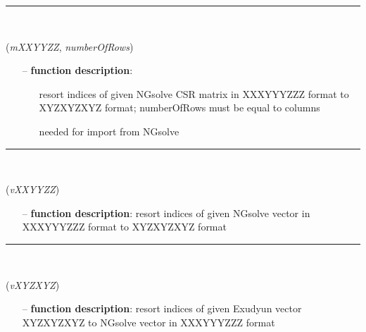 \begin{itemize}[leftmargin=1.4cm]
\begin{itemize}[leftmargin=0.5cm]
\begin{itemize}[leftmargin=1.4cm]
\begin{itemize}[leftmargin=0.5cm]
%
\noindent\rule{8cm}{0.75pt}\vspace{1pt} \\ 
\begin{flushleft}
\label{sec:FEM:ResortIndicesOfCSRmatrix}
({\it mXXYYZZ}, {\it numberOfRows})
\end{flushleft}
\setlength{\itemindent}{0.7cm}
\begin{itemize}[leftmargin=0.7cm]
  \item[--]  {\bf function description}: \vspace{-6pt}
  \begin{itemize}[leftmargin=1.2cm]
\setlength{\itemindent}{-0.7cm}
    \item[] resort indices of given NGsolve CSR matrix in XXXYYYZZZ format to XYZXYZXYZ format; numberOfRows must be equal to columns
    \item[] needed for import from NGsolve
  \end{itemize}
\vspace{12pt}\end{itemize}
%
\noindent\rule{8cm}{0.75pt}\vspace{1pt} \\ 
\begin{flushleft}
\label{sec:FEM:ResortIndicesOfNGvector}
({\it vXXYYZZ})
\end{flushleft}
\setlength{\itemindent}{0.7cm}
\begin{itemize}[leftmargin=0.7cm]
  \item[--]  {\bf function description}: resort indices of given NGsolve vector in XXXYYYZZZ format to XYZXYZXYZ format\vspace{12pt}\end{itemize}
%
\noindent\rule{8cm}{0.75pt}\vspace{1pt} \\ 
\begin{flushleft}
\label{sec:FEM:ResortIndicesExudyn2NGvector}
({\it vXYZXYZ})
\end{flushleft}
\setlength{\itemindent}{0.7cm}
\begin{itemize}[leftmargin=0.7cm]
  \item[--]  {\bf function description}: resort indices of given Exudyun vector XYZXYZXYZ to NGsolve vector in XXXYYYZZZ format\vspace{12pt}\end{itemize}

\end{itemize}
\end{itemize}
\end{itemize}
\end{itemize}
